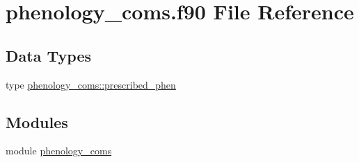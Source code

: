 \hypertarget{phenology__coms_8f90}{}\section{phenology\+\_\+coms.\+f90 File Reference}
\label{phenology__coms_8f90}
\subsection*{Data Types}
\begin{DoxyCompactItemize}
\item 
type \hyperlink{structphenology__coms_1_1prescribed__phen}{phenology\+\_\+coms\+::prescribed\+\_\+phen}
\end{DoxyCompactItemize}
\subsection*{Modules}
\begin{DoxyCompactItemize}
\item 
module \hyperlink{namespacephenology__coms}{phenology\+\_\+coms}
\end{DoxyCompactItemize}
